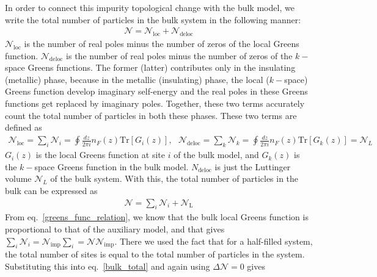 \documentclass[reprint,hidelinks]{revtex4-2}
\begin{document}
\begin{widetext}
In order to connect this impurity topological change with the bulk model, we write the total number of particles in the bulk system in the following manner:
\begin{equation}\begin{aligned}
	\mathcal{N} = \mathcal{N}_\text{loc} + \mathcal{N}_\text{deloc}
\end{aligned}\end{equation}
\(\mathcal{N}_\text{loc}\) is the number of real poles minus the number of zeros of the local Greens function. \(\mathcal{N}_\text{deloc}\) is the number of real poles minus the number of zeros of the \(k-\)space Greens functions. The former (latter) contributes only in the insulating (metallic) phase, because in the metallic (insulating) phase, the local (\(k-\)space) Greens function develop imaginary self-energy and the real poles in these Greens functions get replaced by imaginary poles. Together, these two terms accurately count the total number of particles in both these phases. These two terms are defined as
\begin{equation}\begin{aligned}
	\mathcal{N}_\text{loc} = \sum_i \mathcal{N}_i = \oint \frac{dz}{2\pi i}n_F(z) \text{Tr}\left[G_i(z)\right], ~ ~ ~\mathcal{N}_\text{deloc} = \sum_k \mathcal{N}_k = \oint \frac{dz}{2\pi i}n_F(z) \text{Tr}\left[G_k(z)\right] = \mathcal{N}_L
\end{aligned}\end{equation}
\(G_i(z)\) is the local Greens function at site \(i\) of the bulk model, and \(G_k(z)\) is the \(k-\)space Greens function in the bulk model. \(N_\text{deloc}\) is just the Luttinger volume \(\mathcal{N}_L\) of the bulk system. With this, the total number of particles in the bulk can be expressed as
\begin{equation}\begin{aligned}
	\label{bulk_total}
	\mathcal{N} = \sum_i \mathcal{N}_i + \mathcal{N}_\text{L}
\end{aligned}\end{equation}
From eq.~\ref{greens_func_relation}, we know that the bulk local Greens function is proportional to that of the auxiliary model, and that gives \(\sum_i \mathcal{N}_i = \mathcal{N}_\text{imp}\sum_i = \mathcal{N} \mathcal{N}_\text{imp}\). There we used the fact that for a half-filled system, the total number of sites is equal to the total number of particles in the system. Substituting this into eq.~\ref{bulk_total} and again using \(\Delta \mathcal{N} = 0\) gives
\begin{equation}\begin{aligned}

\end{aligned}
\end{equation}
\end{widetext}
\end{document}
